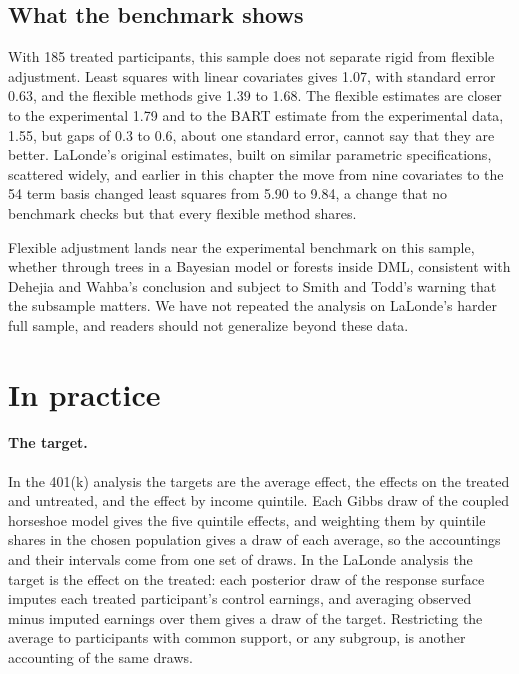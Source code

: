 \subsection{What the benchmark shows}

With 185 treated participants, this sample does not separate rigid from flexible adjustment. Least squares with linear covariates gives 1.07, with standard error 0.63, and the flexible methods give 1.39 to 1.68. The flexible estimates are closer to the experimental 1.79 and to the BART estimate from the experimental data, 1.55, but gaps of 0.3 to 0.6, about one standard error, cannot say that they are better. LaLonde's original estimates, built on similar parametric specifications, scattered widely, and earlier in this chapter the move from nine covariates to the 54 term basis changed least squares from 5.90 to 9.84, a change that no benchmark checks but that every flexible method shares.

Flexible adjustment lands near the experimental benchmark on this sample, whether through trees in a Bayesian model or forests inside DML, consistent with Dehejia and Wahba's conclusion and subject to Smith and Todd's warning that the subsample matters. We have not repeated the analysis on LaLonde's harder full sample, and readers should not generalize beyond these data.

\section{In practice}

\paragraph{The target.} In the 401(k) analysis the targets are the average effect, the effects on the treated and untreated, and the effect by income quintile. Each Gibbs draw of the coupled horseshoe model gives the five quintile effects, and weighting them by quintile shares in the chosen population gives a draw of each average, so the accountings and their intervals come from one set of draws. In the LaLonde analysis the target is the effect on the treated: each posterior draw of the response surface imputes each treated participant's control earnings, and averaging observed minus imputed earnings over them gives a draw of the target. Restricting the average to participants with common support, or any subgroup, is another accounting of the same draws.

